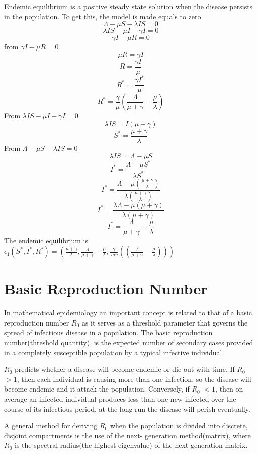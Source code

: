 \documentclass[a4paper,12pt]{report}
\numberwithin{equation}{section}
\begin{document}
Endemic equilibrium is a positive steady state solution when the disease persists in the population. To get this, the model is made equals to zero
$$\Lambda - \mu S - \lambda IS = 0$$
$$\lambda IS - \mu I - \gamma I = 0$$
$$\gamma I - \mu R = 0 $$
from $\gamma I - \mu R = 0 $
$$\mu R = \gamma I $$
$$R = \frac{\gamma I}{\mu}$$
$$R^{*} = \frac{\gamma I^{*}}{\mu} $$
$$R^{*} = \frac{\gamma}{\mu} \left(\frac{\Lambda}{\mu + \gamma} - \frac{\mu}{\lambda} \right)$$
From $\lambda IS - \mu I - \gamma I = 0 $
$$ \lambda IS = I(\mu + \gamma)$$
$$S^{*} = \frac{\mu + \gamma}{\lambda} $$
From $\Lambda - \mu S - \lambda IS = 0$
$$\lambda IS = \Lambda - \mu S $$
$$I^{*} = \frac{\Lambda- \mu S^{*}}{\lambda S^{*}}$$
$$I^{*} = \frac{\Lambda - \mu \left( \frac{\mu + \gamma}{\lambda}\right)}{\lambda \left( \frac{\mu + \gamma}{\lambda}\right)}$$
$$I^{*}= \frac{\lambda \Lambda - \mu (\mu+\gamma)}{\lambda(\mu + \gamma )}$$
$$I^{*}= \frac{\Lambda}{\mu + \gamma} - \frac{\mu}{\lambda}$$
The endemic equilibrium is$\epsilon_{1}   (S^{*},I^{*},R^{*}) = \left(\frac{\mu + \gamma}{\lambda}, \frac{\Lambda}{\mu + \gamma} - \frac{\mu}{\lambda}, \frac{\gamma}{\ mu}\left( (\frac{\Lambda}{\mu + \gamma} - \frac{\mu}{\lambda})\right)\right)$ 
\section{Basic Reproduction Number}


In mathematical epidemiology an important concept is related to that of a basic reproduction number \textit{$R_0$} as it serves as a threshold parameter that governs the spread of infectious disease in a population. The basic reproduction number(threshold quantity), is the expected number of secondary cases provided in a completely susceptible population by a typical infective individual.

\textit{$R_{0}$} predicts whether a disease will become endemic or die-out with time. If \textit{$R_{0}$} $> 1$, then each individual is causing more than one infection, so the disease will become endemic and it attack the population. Conversely, if \textit{$R_0$} $< 1$, then on average an infected individual produces less than one new infected over the course of its infectious period, at the long run the disease will perish eventually.

A general method for deriving \textit{$R_0$} when the population is divided into discrete, disjoint compartments is the use of the next- generation method(matrix), where \textit{$R_0$} is the spectral radius(the highest eigenvalue) of the next generation matrix.
\end{document}
